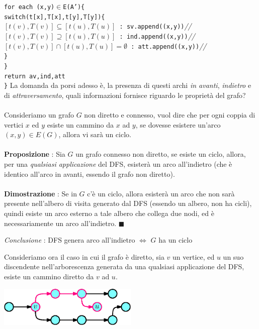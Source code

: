 \documentclass[12pt, letterpaper]{article}
\newcommand{\code}[1]{\colorbox{light-gray}{\texttt{#1}}}
\newcommand{\acc}{\\\hphantom{}\\}
\newcommand{\comm}[1]{\color{lg}\textit{\hphantom{spaz}// \text{#1}}\color{black}}
\begin{document}
{\hphantom{ident}\code{for each (x,y)\(\in\)E(A')\{}\\
\hphantom{ident}\hphantom{ident}\code{switch(t[x],T[x],t[y],T[y])\{}\\
\hphantom{ident}\hphantom{ident}\hphantom{ident}\code{$[t(v),T(v)]\subseteq[t(u),T(u)]$ : sv.append((x,y))}\comm{primo caso}\\
\hphantom{ident}\hphantom{ident}\hphantom{ident}\code{$[t(v),T(v)]\supseteq[t(u),T(u)]$ : ind.append((x,y))}\comm{secondo caso}\\
\hphantom{ident}\hphantom{ident}\hphantom{ident}\code{$[t(v),T(v)]\cap[t(u),T(u)]=\emptyset$ : att.append((x,y))}\comm{terzo caso}\\
\hphantom{ident}\hphantom{ident}\code{\}}\\
\hphantom{ident}\code{\}}\\
\hphantom{ident}\code{return av,ind,att}\\
\code{\}}}\newpage
La domanda da porsi adesso è, la presenza di questi archi \textit{in avanti}, \textit{indietro} e di \textit{attraversamento},
quali informazioni fornisce riguardo le proprietà del grafo?\acc Consideriamo un grafo \(G\) non diretto e connesso, vuol dire che per
ogni coppia di vertici \(x\) ed $y$ esiste un cammino da $x$ ad $y$, se dovesse esistere un'arco \((x,y)\in E(G)\), allora
vi sarà un ciclo.\acc
\textbf{Proposizione} : Sia \(G\) un grafo connesso non diretto, se esiste un ciclo, allora, per una
\textit{qualsiasi applicazione} del DFS, esisterà un arco all'indietro (che è identico all'arco in avanti,
essendo il grafo non diretto).\acc
\textbf{Dimostrazione} : Se in \(G\) c'è un ciclo, allora esisterà un arco che non sarà presente nell'albero di visita
generato dal DFS (essendo un albero, non ha cicli), quindi esiste un arco esterno a tale albero che collega due nodi,
ed è necessariamente un arco all'indietro. \(\blacksquare\)
\begin{center}
    \textit{Conclusione} : DFS genera arco all'indietro $\iff$ \(G\) ha un ciclo
\end{center}
Consideriamo ora il caso in cui il grafo è diretto, sia \(v\) un vertice, ed \(u\) un suo discendente nell'arborescenza
generata da una qualsiasi applicazione del DFS, esiste un cammino diretto da \(v\) ad \(u\).\begin{center}
    \includegraphics[width=0.5\textwidth ]{images/discentente.eps}
\end{center}
\end{document}
